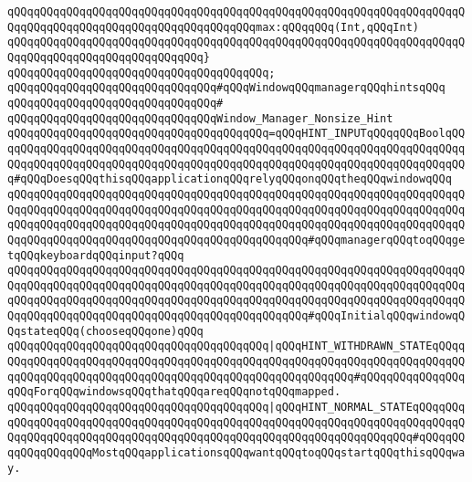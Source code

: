 \verb|qQQqqQQqqQQqqQQqqQQqqQQqqQQqqQQqqQQqqQQqqQQqqQQqqQQqqQQqqQQqqQQqqQQqqQQqqQQqqQQqqQQqqQQqqQQqqQQqqQQqqQQqqQQqmax:qQQqqQQq(Int,qQQqInt)|\newline
\verb|qQQqqQQqqQQqqQQqqQQqqQQqqQQqqQQqqQQqqQQqqQQqqQQqqQQqqQQqqQQqqQQqqQQqqQQqqQQqqQQqqQQqqQQqqQQqqQQqqQQq}|\newline
\verb|qQQqqQQqqQQqqQQqqQQqqQQqqQQqqQQqqQQqqQQq;|\newline
\newline
\newline
\verb|qQQqqQQqqQQqqQQqqQQqqQQqqQQqqQQq#qQQqWindowqQQqmanagerqQQqhintsqQQq|\newline
\verb|qQQqqQQqqQQqqQQqqQQqqQQqqQQqqQQq#|\newline
\verb|qQQqqQQqqQQqqQQqqQQqqQQqqQQqqQQqWindow_Manager_Nonsize_Hint|\newline
\verb|qQQqqQQqqQQqqQQqqQQqqQQqqQQqqQQqqQQqqQQq=qQQqHINT_INPUTqQQqqQQqBoolqQQqqQQqqQQqqQQqqQQqqQQqqQQqqQQqqQQqqQQqqQQqqQQqqQQqqQQqqQQqqQQqqQQqqQQqqQQqqQQqqQQqqQQqqQQqqQQqqQQqqQQqqQQqqQQqqQQqqQQqqQQqqQQqqQQqqQQqqQQqqQQq#qQQqDoesqQQqthisqQQqapplicationqQQqrelyqQQqonqQQqtheqQQqwindowqQQq|\newline
\verb|qQQqqQQqqQQqqQQqqQQqqQQqqQQqqQQqqQQqqQQqqQQqqQQqqQQqqQQqqQQqqQQqqQQqqQQqqQQqqQQqqQQqqQQqqQQqqQQqqQQqqQQqqQQqqQQqqQQqqQQqqQQqqQQqqQQqqQQqqQQqqQQqqQQqqQQqqQQqqQQqqQQqqQQqqQQqqQQqqQQqqQQqqQQqqQQqqQQqqQQqqQQqqQQqqQQqqQQqqQQqqQQqqQQqqQQqqQQqqQQqqQQqqQQqqQQqqQQq#qQQqmanagerqQQqtoqQQqgetqQQqkeyboardqQQqinput?qQQq|\newline
\verb|qQQqqQQqqQQqqQQqqQQqqQQqqQQqqQQqqQQqqQQqqQQqqQQqqQQqqQQqqQQqqQQqqQQqqQQqqQQqqQQqqQQqqQQqqQQqqQQqqQQqqQQqqQQqqQQqqQQqqQQqqQQqqQQqqQQqqQQqqQQqqQQqqQQqqQQqqQQqqQQqqQQqqQQqqQQqqQQqqQQqqQQqqQQqqQQqqQQqqQQqqQQqqQQqqQQqqQQqqQQqqQQqqQQqqQQqqQQqqQQqqQQqqQQqqQQqqQQq#qQQqInitialqQQqwindowqQQqstateqQQq(chooseqQQqone)qQQq|\newline
\verb|qQQqqQQqqQQqqQQqqQQqqQQqqQQqqQQqqQQqqQQq|\verb#|qQQqHINT_WITHDRAWN_STATEqQQqqQQqqQQqqQQqqQQqqQQqqQQqqQQqqQQqqQQqqQQqqQQqqQQqqQQqqQQqqQQqqQQqqQQqqQQqqQQqqQQqqQQqqQQqqQQqqQQqqQQqqQQqqQQqqQQqqQQqqQQqqQQq#\verb|#qQQqqQQqqQQqqQQqqQQqForqQQqwindowsqQQqthatqQQqareqQQqnotqQQqmapped.|\newline
\verb|qQQqqQQqqQQqqQQqqQQqqQQqqQQqqQQqqQQqqQQq|\verb#|qQQqHINT_NORMAL_STATEqQQqqQQqqQQqqQQqqQQqqQQqqQQqqQQqqQQqqQQqqQQqqQQqqQQqqQQqqQQqqQQqqQQqqQQqqQQqqQQqqQQqqQQqqQQqqQQqqQQqqQQqqQQqqQQqqQQqqQQqqQQqqQQqqQQqqQQqqQQq#\verb|#qQQqqQQqqQQqqQQqqQQqMostqQQqapplicationsqQQqwantqQQqtoqQQqstartqQQqthisqQQqway.|\newline

